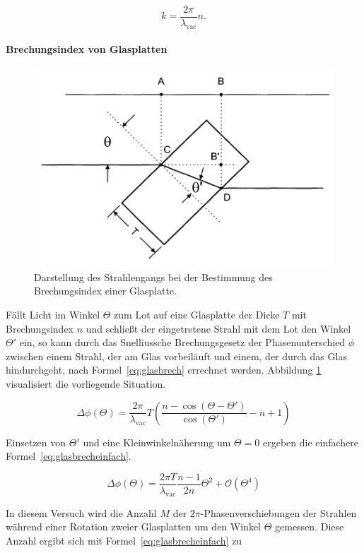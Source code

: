 \begin{equation*}
k = \frac{2\pi}{\lambda_\text{vac}}n.
\end{equation*}

\paragraph{Brechungsindex von Glasplatten}
\begin{figure}
\centering
\includegraphics[width=0.7\linewidth]{img/slab.png}
\caption{Darstellung des Strahlengangs bei der Bestimmung des Brechungsindex einer Glasplatte.  \cite{V64}}
\label{fig:slab}
\end{figure}

Fällt Licht im Winkel $\Theta$ zum Lot auf eine Glasplatte der Dicke $T$ mit Brechungsindex $n$ und schließt der eingetretene Strahl mit dem Lot den Winkel $\Theta'$ ein, so kann durch das Snelliussche Brechungsgesetz der Phasenunterschied $\phi$ zwischen einem Strahl, der am Glas vorbeiläuft und einem, der durch das Glas hindurchgeht, nach Formel~\eqref{eq:glasbrech} errechnet werden. Abbildung \ref{fig:slab} visualisiert die vorliegende Situation.

\begin{equation}
\Delta\phi(\Theta) = \frac{2\pi}{\lambda_\text{vac}}T\left(
\frac{n-\cos(\Theta - \Theta')}{\cos(\Theta')} - n+1\right)
\label{eq:glasbrech}
\end{equation}

Einsetzen von $\Theta'$ und eine Kleinwinkelnäherung um $\Theta = 0$ ergeben die einfachere Formel~\eqref{eq:glasbrecheinfach}.

\begin{equation}
\Delta\phi(\Theta) = \frac{2\pi T}{\lambda_\text{vac}}
\frac{n-1}{2n}\Theta^2 + \mathcal{O}(\Theta^4)
\label{eq:glasbrecheinfach}
\end{equation}

In diesem Versuch wird die Anzahl $M$ der $2\pi$-Phasenverschiebungen der Strahlen während einer Rotation zweier Glasplatten um den Winkel $\Theta$ gemessen. Diese Anzahl ergibt sich mit Formel~\eqref{eq:glasbrecheinfach} zu

